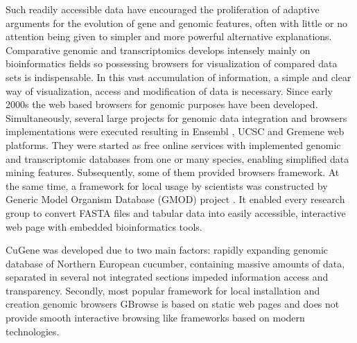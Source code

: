 \documentclass[]{spie}
\newcommand{\appName}{CuGene}
\begin{document}
Such readily accessible data have encouraged the proliferation of adaptive arguments for the evolution of gene and genomic features, often with little or no attention being given to simpler and more powerful alternative explanations. Comparative genomic and transcriptomics develops intensely mainly on bioinformatics fields so possessing browsers for visualization of compared data sets is indispensable.
In this vast accumulation of information,
a simple and clear way of visualization, access and modification of data is necessary.
Since early 2000s the web based browsers for genomic purposes have been developed.
Simultaneously, several large projects for genomic data integration and browsers implementations were executed
resulting in Ensembl \cite{hubbard2002ensembl}, UCSC \cite{karolchik2003ucsc} and Gremene \cite{ware2002gramene} web platforms.
They were started as free online services with implemented genomic and transcriptomic databases from one or many species,
enabling simplified data mining features.
Subsequently, some of them provided browsers framework.
At the same time, a framework for local usage by scientists was constructed by Generic Model Organism Database (GMOD) project \cite{stein2002generic}.
It enabled every research group to convert FASTA files and tabular data into easily accessible, interactive web page with embedded bioinformatics tools.

\appName{} was developed due to two main factors: rapidly expanding genomic database of Northern European cucumber, containing massive amounts of data,
separated in several not integrated sections impeded information access and transparency.
Secondly, most popular framework for local installation and creation genomic browsers GBrowse is based on static web pages and
does not provide smooth interactive browsing like frameworks based on modern technologies.
\end{document}
